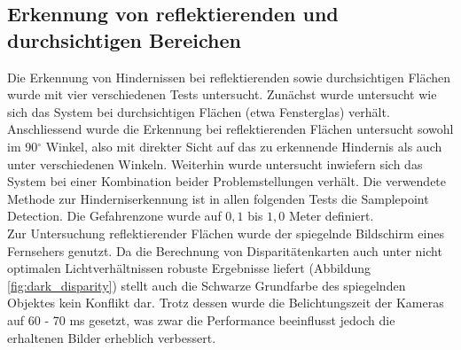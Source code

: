 \subsection{Erkennung von reflektierenden und durchsichtigen Bereichen}
\label{subsec:test_reflection_translucency}

Die Erkennung von Hindernissen bei reflektierenden sowie durchsichtigen Flächen wurde mit vier verschiedenen Tests untersucht. Zunächst wurde untersucht wie sich das System bei durchsichtigen Flächen (etwa Fensterglas) verhält. Anschliessend wurde die Erkennung bei reflektierenden Flächen untersucht sowohl im 90$^\circ$ Winkel, also mit direkter Sicht auf das zu erkennende Hindernis als auch unter verschiedenen Winkeln. Weiterhin wurde untersucht inwiefern sich das System bei einer Kombination beider Problemstellungen verhält. Die verwendete Methode zur Hinderniserkennung ist in allen folgenden Tests die Samplepoint Detection. Die Gefahrenzone wurde auf $0,1$ bis $1,0$ Meter definiert.\\

\noindent
Zur Untersuchung reflektierender Flächen wurde der spiegelnde Bildschirm eines Fernsehers genutzt. Da die Berechnung von Disparitätenkarten auch unter nicht optimalen Lichtverhältnissen robuste Ergebnisse liefert (Abbildung \ref{fig:dark_disparity}) stellt auch die Schwarze Grundfarbe des spiegelnden Objektes kein Konflikt dar. Trotz dessen wurde die Belichtungszeit der Kameras auf 60 - 70 ms gesetzt, was zwar die Performance beeinflusst jedoch die erhaltenen Bilder erheblich verbessert.

